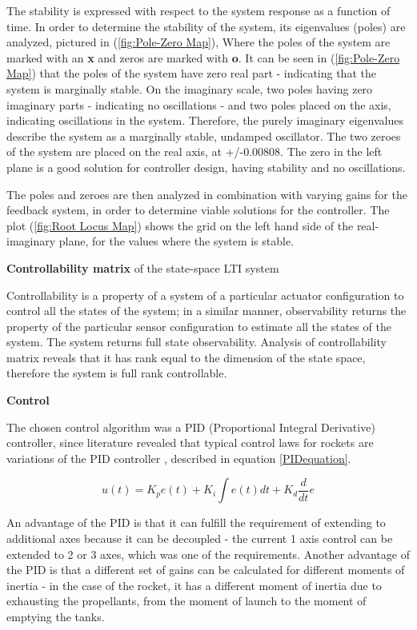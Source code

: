 The stability is expressed with respect to the system response as a function of time. 
In order to determine the stability of the system, its eigenvalues (poles) are analyzed, pictured in (\ref{fig:Pole-Zero Map}), Where the poles of the system are marked with an \textbf{x} and zeros are marked with \textbf{o}. It can be seen in (\ref{fig:Pole-Zero Map}) that the poles of the system have zero real part - indicating that the system is marginally stable. 
On the imaginary scale, two poles having zero imaginary parts - indicating no oscillations - and two poles placed on the axis, indicating oscillations in the system. Therefore, the purely imaginary eigenvalues describe the system as a marginally stable, undamped oscillator. 
The two zeroes of the system are placed on the real axis, at +/-0.00808. The zero in the left plane is a good solution for controller design, having stability and no oscillations. 


The poles and zeroes are then analyzed in combination with varying gains for the feedback system, in order to determine viable solutions for the controller. The plot (\ref{fig:Root Locus Map}) shows the grid on the left hand side of the real-imaginary plane, for the values where the system is stable. 

\textbf{Controllability matrix} of the state-space LTI system

Controllability is a property of a system of a particular actuator configuration to control all the states of the system; in a similar manner, observability returns the property of the particular sensor configuration to estimate all the states of the system. \cite{preumont2018vibration}
The system returns full state observability. 
Analysis of controllability matrix reveals that it has rank equal to the dimension of the state space, therefore the system is full rank controllable.

\textbf{Control}

The chosen control algorithm was a PID (Proportional Integral Derivative) controller, since literature revealed that typical control laws for rockets are variations of the PID controller \cite{de2012spacecraft} \cite{taylor2017introduction}, described in equation  \ref{PIDequation}.

\begin{equation}\label{PIDequation}
u(t)=K_{p}e(t) + K_{i}\int{e}(t)dt+K_{d}\frac{d}{dt}e 
\end{equation}

An advantage of the PID is that it can fulfill the requirement of extending to additional axes because it can be decoupled - the current 1 axis control can be extended to 2 or 3 axes, which was one of the requirements. Another advantage of the PID is that a different set of gains can be calculated for different moments of inertia - in the case of the rocket, it has a different moment of inertia due to exhausting the propellants, from the moment of launch to the moment of emptying the tanks. 

